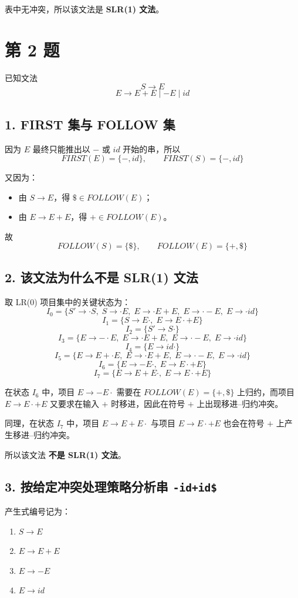 \documentclass[12pt]{article}
\begin{document}
表中无冲突，所以该文法是 \textbf{SLR(1) 文法}。

\section*{第 2 题}
已知文法
\[
S \rightarrow E
\]
\[
E \rightarrow E+E \mid -E \mid id
\]

\subsection*{1. FIRST 集与 FOLLOW 集}
因为 $E$ 最终只能推出以 $-$ 或 $id$ 开始的串，所以
\[
FIRST(E)=\{-,id\},\qquad FIRST(S)=\{-,id\}
\]

又因为：
\begin{itemize}
    \item 由 $S \rightarrow E$，得 $\$ \in FOLLOW(E)$；
    \item 由 $E \rightarrow E+E$，得 $+ \in FOLLOW(E)$。
\end{itemize}
故
\[
FOLLOW(S)=\{\$\},\qquad FOLLOW(E)=\{+,\$\}
\]

\subsection*{2. 该文法为什么不是 SLR(1) 文法}
取 LR(0) 项目集中的关键状态为：
\[
I_0=\{S' \rightarrow \cdot S,\; S \rightarrow \cdot E,\; E \rightarrow \cdot E+E,\; E \rightarrow \cdot -E,\; E \rightarrow \cdot id\}
\]
\[
I_1=\{S \rightarrow E \cdot,\; E \rightarrow E \cdot +E\}
\]
\[
I_2=\{S' \rightarrow S \cdot\}
\]
\[
I_3=\{E \rightarrow - \cdot E,\; E \rightarrow \cdot E+E,\; E \rightarrow \cdot -E,\; E \rightarrow \cdot id\}
\]
\[
I_4=\{E \rightarrow id \cdot\}
\]
\[
I_5=\{E \rightarrow E+ \cdot E,\; E \rightarrow \cdot E+E,\; E \rightarrow \cdot -E,\; E \rightarrow \cdot id\}
\]
\[
I_6=\{E \rightarrow -E \cdot,\; E \rightarrow E \cdot +E\}
\]
\[
I_7=\{E \rightarrow E+E \cdot,\; E \rightarrow E \cdot +E\}
\]

在状态 $I_6$ 中，项目 $E \rightarrow -E \cdot$ 需要在 $FOLLOW(E)=\{+,\$\}$ 上归约，而项目 $E \rightarrow E \cdot +E$ 又要求在输入 $+$ 时移进，因此在符号 $+$ 上出现移进--归约冲突。

同理，在状态 $I_7$ 中，项目 $E \rightarrow E+E \cdot$ 与项目 $E \rightarrow E \cdot +E$ 也会在符号 $+$ 上产生移进--归约冲突。

所以该文法 \textbf{不是 SLR(1) 文法}。

\subsection*{3. 按给定冲突处理策略分析串 \texttt{-id+id\$}}
产生式编号记为：
\begin{enumerate}
    \item $S \rightarrow E$
    \item $E \rightarrow E+E$
    \item $E \rightarrow -E$
    \item $E \rightarrow id$
\end{enumerate}
\end{document}
